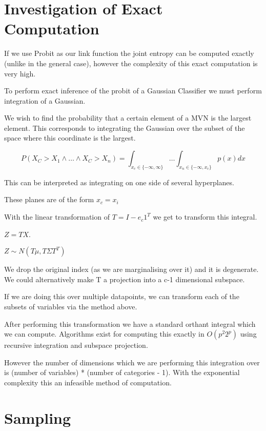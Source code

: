 \documentclass[12pt, a4paper]{report}
\theoremstyle{definition}
\begin{document}
\section{Investigation of Exact Computation}

If we use Probit as our link function the joint entropy can be computed exactly (unlike in the general case), however the complexity of this exact computation is very high.

To perform exact inference of the probit of a Gaussian Classifier we must perform integration of a Gaussian.

We wish to find the probability that a certain element of a MVN is the largest element. This corresponds to integrating the Gaussian over the subset of the space where this coordinate is the largest.

$$P(X_C > X_1 \land \ldots \land X_C > X_n) = \int_{x_c \in \{ -\infty, \infty \} } \ldots \int_{x_n \in \{ -\infty , x_c \}} p(x) dx$$

This can be interpreted as integrating on one side of several hyperplanes.

These planes are of the form $x_c = x_i$

With the linear transformation of $T = I - e_c 1^T$ we get to transform this integral.

$Z = TX$.

$Z \sim N(T \mu, T \Sigma T^T)$

We drop the original index (as we are marginalising over it) and it is degenerate. We could alternatively make T a projection into a c-1 dimensional subspace.

If we are doing this over multiple datapoints, we can transform each of the subsets of variables via the method above.

After performing this transformation we have a standard orthant integral which we can compute. Algorithms exist for computing this exactly in $O(p^2 2^p)$ using recursive integration and subspace projection. \cite{orthant}


However the number of dimensions which we are performing this integration over is (number of variables) * (number of categories - 1). With the exponential complexity this an infeasible method of computation.



\section{Sampling}
\end{document}
